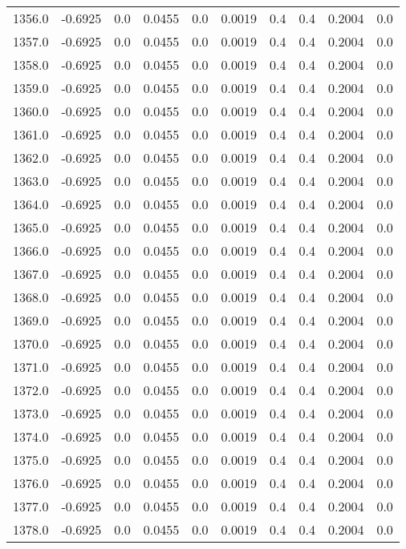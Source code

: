\begin{longtable}{lrrrrrrrrr}
1356.0 & -0.6925 & 0.0 & 0.0455 & 0.0 & 0.0019 & 0.4 & 0.4 & 0.2004 & 0.0 \\
1357.0 & -0.6925 & 0.0 & 0.0455 & 0.0 & 0.0019 & 0.4 & 0.4 & 0.2004 & 0.0 \\
1358.0 & -0.6925 & 0.0 & 0.0455 & 0.0 & 0.0019 & 0.4 & 0.4 & 0.2004 & 0.0 \\
1359.0 & -0.6925 & 0.0 & 0.0455 & 0.0 & 0.0019 & 0.4 & 0.4 & 0.2004 & 0.0 \\
1360.0 & -0.6925 & 0.0 & 0.0455 & 0.0 & 0.0019 & 0.4 & 0.4 & 0.2004 & 0.0 \\
1361.0 & -0.6925 & 0.0 & 0.0455 & 0.0 & 0.0019 & 0.4 & 0.4 & 0.2004 & 0.0 \\
1362.0 & -0.6925 & 0.0 & 0.0455 & 0.0 & 0.0019 & 0.4 & 0.4 & 0.2004 & 0.0 \\
1363.0 & -0.6925 & 0.0 & 0.0455 & 0.0 & 0.0019 & 0.4 & 0.4 & 0.2004 & 0.0 \\
1364.0 & -0.6925 & 0.0 & 0.0455 & 0.0 & 0.0019 & 0.4 & 0.4 & 0.2004 & 0.0 \\
1365.0 & -0.6925 & 0.0 & 0.0455 & 0.0 & 0.0019 & 0.4 & 0.4 & 0.2004 & 0.0 \\
1366.0 & -0.6925 & 0.0 & 0.0455 & 0.0 & 0.0019 & 0.4 & 0.4 & 0.2004 & 0.0 \\
1367.0 & -0.6925 & 0.0 & 0.0455 & 0.0 & 0.0019 & 0.4 & 0.4 & 0.2004 & 0.0 \\
1368.0 & -0.6925 & 0.0 & 0.0455 & 0.0 & 0.0019 & 0.4 & 0.4 & 0.2004 & 0.0 \\
1369.0 & -0.6925 & 0.0 & 0.0455 & 0.0 & 0.0019 & 0.4 & 0.4 & 0.2004 & 0.0 \\
1370.0 & -0.6925 & 0.0 & 0.0455 & 0.0 & 0.0019 & 0.4 & 0.4 & 0.2004 & 0.0 \\
1371.0 & -0.6925 & 0.0 & 0.0455 & 0.0 & 0.0019 & 0.4 & 0.4 & 0.2004 & 0.0 \\
1372.0 & -0.6925 & 0.0 & 0.0455 & 0.0 & 0.0019 & 0.4 & 0.4 & 0.2004 & 0.0 \\
1373.0 & -0.6925 & 0.0 & 0.0455 & 0.0 & 0.0019 & 0.4 & 0.4 & 0.2004 & 0.0 \\
1374.0 & -0.6925 & 0.0 & 0.0455 & 0.0 & 0.0019 & 0.4 & 0.4 & 0.2004 & 0.0 \\
1375.0 & -0.6925 & 0.0 & 0.0455 & 0.0 & 0.0019 & 0.4 & 0.4 & 0.2004 & 0.0 \\
1376.0 & -0.6925 & 0.0 & 0.0455 & 0.0 & 0.0019 & 0.4 & 0.4 & 0.2004 & 0.0 \\
1377.0 & -0.6925 & 0.0 & 0.0455 & 0.0 & 0.0019 & 0.4 & 0.4 & 0.2004 & 0.0 \\
1378.0 & -0.6925 & 0.0 & 0.0455 & 0.0 & 0.0019 & 0.4 & 0.4 & 0.2004 & 0.0 \\

\end{longtable}
